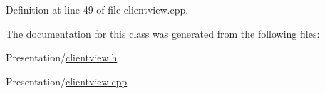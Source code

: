 Definition at line 49 of file clientview.\+cpp.



The documentation for this class was generated from the following files\+:\begin{DoxyCompactItemize}
\item 
Presentation/\hyperlink{clientview_8h}{clientview.\+h}\item 
Presentation/\hyperlink{clientview_8cpp}{clientview.\+cpp}\end{DoxyCompactItemize}
